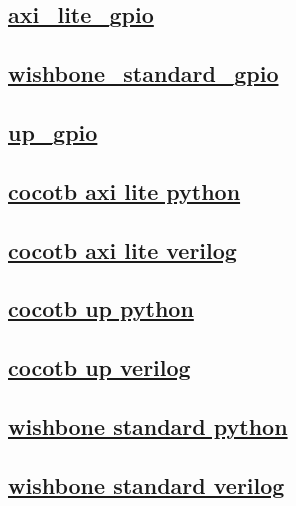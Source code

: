 \documentclass{article}
\begin{document}
  


  \subsection{\href{../files/axi_lite_gpio-v.html}{axi\_lite\_gpio}}

  \subsection{\href{../files/wishbone_standard_gpio-v.html}{wishbone\_standard\_gpio}}

  \subsection{\href{../files/up_gpio-v.html}{up\_gpio}}

  \subsection{\href{../files2/tb_cocotb_axi_lite-py.html}{cocotb axi lite python}}
  \subsection{\href{../files2/tb_cocotb_axi_lite-v.html}{cocotb axi lite verilog}}
  \subsection{\href{../files2/tb_cocotb_up-py.html}{cocotb up python}}
  \subsection{\href{../files2/tb_cocotb_up-v.html}{cocotb up verilog}}
  \subsection{\href{../files2/tb_cocotb_wishbone_standard-py.html}{wishbone standard python}}
  \subsection{\href{../files2/tb_cocotb_wishbone_standard-v.html}{wishbone standard verilog}}
\end{document}
